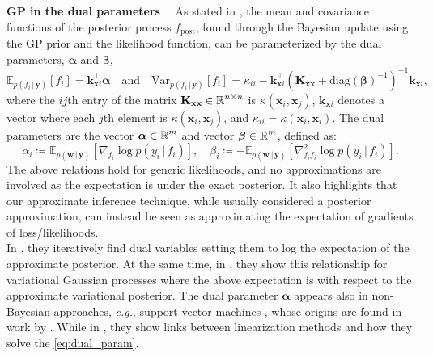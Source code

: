 \documentclass{article}
\makeatletter
\renewcommand{\paragraph}[1]{{\bf #1}~~}
\newcommand{\eg}{\textit{e.g.\@}\xspace}
\newcommand{\mathbold}[1]{\bm{#1}}
\newcommand{\mbf}[1]{\mathbf{#1}}
\renewcommand{\mid}{\,|\,}
\newcommand{\valpha}[0]{\mathbold{\alpha}}
\newcommand{\vbeta}[0]{\mathbold{\beta}}
\newcommand{\diag}{\text{{diag}}}
\newcommand{\vx}{\mbf{x}}
\newcommand{\vy}{\mbf{y}}
\newcommand{\vw}{\mbf{w}}
\newcommand{\MKxx}{\mbf{K}_{\mbf{x}\mbf{x}}}
\newcommand{\vk}{\mbf{k}}
\newcommand{\myexpect}{\mathbb{E}}
\makeatother
\begin{document}
\paragraph{GP in the dual parameters}
As stated in \citet[Parameterization Lemma~1]{csato2002sparse}, the mean and covariance functions of the posterior process $f_{\textrm{post}}$, found through the Bayesian update using the GP prior and the likelihood function, can be parameterized by the dual parameters, $\valpha$ and $\vbeta$,
\begin{equation}  \label{eq:gp_pred}
  \myexpect_{p(f_i \mid\vy)}[f_i]= \vk_{\vx i}^\top \valpha \quad \text{and} \quad
  \mathrm{Var}_{p(f_i \mid \vy)}[f_i] = \kappa_{ii} - \vk_{\vx i}^\top ( \MKxx + \diag(\vbeta)^{-1})^{-1} \vk_{\vx i},
\end{equation}
where the $ij$th entry of the matrix $\MKxx \in \R^{n \times n}$ is $\kappa(\vx_i,\vx_j)$, $\vk_{\vx i}$ denotes a vector where each $j$th element is $\kappa(\vx_i, \vx_j)$, and $\kappa_{ii} = \kappa(\vx_i, \vx_i)$.  The dual parameters are the vector $\valpha \in \R^{m}$ and vector $\vbeta \in \R^{m}$, defined as:
\begin{equation}
\label{eq:dual_param}
\alpha_i \coloneqq \myexpect_{p(\vw \mid \vy)}[\nabla_{f_i}\log p(y_i \mid f_i)],  \quad
\beta_i \coloneqq - \myexpect_{p(\vw \mid \vy)}[\nabla^2_{f_i f_i}\log p(y_i \mid f_i)] .
\end{equation}
%
The above relations hold for generic likelihoods, and no approximations are involved as the expectation is under the exact posterior. 
It also highlights that our approximate inference technique, while usually considered a posterior approximation, can instead be seen as approximating the expectation of gradients of loss/likelihoods. \\
In \citet{csato2002sparse}, they iteratively find dual variables setting them to log the expectation of the approximate posterior. 
At the same time, in \cite{adam2021dual, chang2020fast}, they show this relationship for variational Gaussian processes where the above expectation is with respect to the approximate variational posterior. The dual parameter $\valpha$ appears also in non-Bayesian approaches, \eg, support vector machines \citep{cortes1995support}, whose origins are found in work by \citet{kimeldorf1971some}. While in \citet{wilkinson2023bayes}, they show links between linearization methods and how they solve the \cref{eq:dual_param}.
\end{document}
